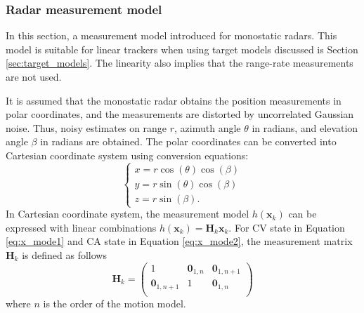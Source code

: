 \documentclass[english, 12pt, a4paper, elec, utf8, a-1b, online]{aaltothesis}
\renewcommand{\vec}[1]{\mathbf{#1}}
\newcommand{\x}{\vec{x}_k}
\newcommand{\omodel}{\vec{H}_k}
\begin{document}
\subsubsection{Radar measurement model} \label{sec:measurement_model}

In this section, a measurement model introduced for monostatic radars.
This model is suitable for linear trackers when using target models discussed is Section \ref{sec:target_models}.
The linearity also implies that the range-rate measurements are not used.

It is assumed that the monostatic radar obtains the position measurements in polar coordinates, and the measurements are distorted by uncorrelated Gaussian noise.
Thus, noisy estimates on range $r$, azimuth angle $\theta$ in radians, and elevation angle $\beta$ in radians are obtained.
The polar coordinates can be converted into Cartesian coordinate system using conversion equations:
\begin{equation}
\left\{
\begin{array}{l}
    x = r \cos(\theta) \cos(\beta) \\
    y = r \sin(\theta) \cos(\beta) \\
    z = r \sin(\beta).
\end{array}\right.
\end{equation}
In Cartesian coordinate system, the measurement model $h(\x)$ can be expressed with linear combinations $h(\x) = \omodel \x$.
For CV state in Equation \eqref{eq:x_mode1} and CA state in Equation \eqref{eq:x_mode2}, the measurement matrix $\omodel$ is defined as follows
\begin{equation}\label{eq:position_measurement_matrix}
    \omodel = 
       \begin{pmatrix}
            1 & \vec{0}_{1, n} & \vec{0}_{1, n+1}\\ 
            \vec{0}_{1, n+1} & 1 & \vec{0}_{1, n}\\ 
        \end{pmatrix}
\end{equation}
where $n$ is the order of the motion model.
\end{document}
